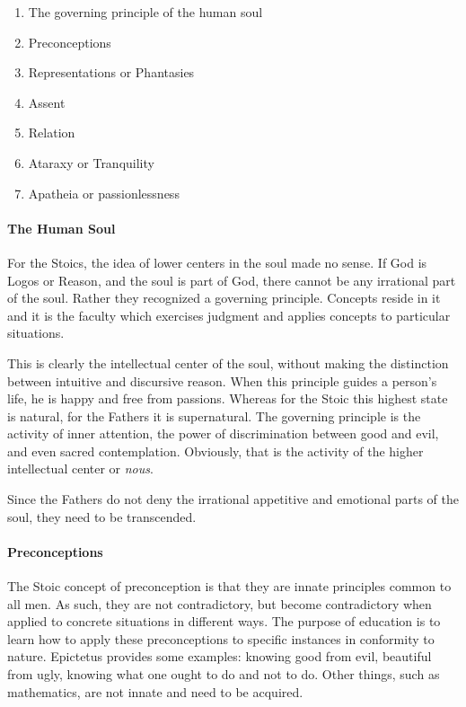 \begin{enumerate}
\item The governing principle of the human soul 
\item Preconceptions 
\item Representations or Phantasies 
\item Assent 
\item Relation 
\item Ataraxy or Tranquility 
\item Apatheia or passionlessness 
\end{enumerate}
\paragraph{The Human Soul}
For the Stoics, the idea of lower centers in the soul made no sense. If God is Logos or Reason, and the soul is part of God, there cannot be any irrational part of the soul. Rather they recognized a governing principle. Concepts reside in it and it is the faculty which exercises judgment and applies concepts to particular situations.

This is clearly the intellectual center of the soul, without making the distinction between intuitive and discursive reason. When this principle guides a person's life, he is happy and free from passions. Whereas for the Stoic this highest state is natural, for the Fathers it is supernatural. The governing principle is the activity of inner attention, the power of discrimination between good and evil, and even sacred contemplation. Obviously, that is the activity of the higher intellectual center or \emph{nous}.

Since the Fathers do not deny the irrational appetitive and emotional parts of the soul, they need to be transcended.

\paragraph{Preconceptions}
The Stoic concept of preconception is that they are innate principles common to all men. As such, they are not contradictory, but become contradictory when applied to concrete situations in different ways. The purpose of education is to learn how to apply these preconceptions to specific instances in conformity to nature. Epictetus provides some examples: knowing good from evil, beautiful from ugly, knowing what one ought to do and not to do. Other things, such as mathematics, are not innate and need to be acquired.

